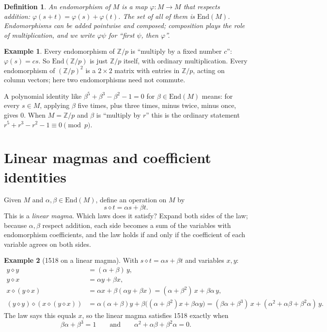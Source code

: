 \documentclass[11pt]{article}
\newtheorem{definition}{Definition}
\theoremstyle{definition}\newtheorem{example}{Example}\newtheorem{exercise}{Exercise}
\theoremstyle{remark}\newtheorem*{remark}{Remark}
\newcommand{\op}{\diamond}
\newcommand{\Z}{\mathbb{Z}}
\newcommand{\End}{\mathrm{End}}
\begin{document}
\begin{definition}
An \emph{endomorphism} of $M$ is a map $\varphi\colon M\to M$ that respects addition: $\varphi(s+t)=\varphi(s)+\varphi(t)$. The set of all of them is $\End(M)$. Endomorphisms can be added pointwise and composed; composition plays the role of multiplication, and we write $\varphi\psi$ for ``first $\psi$, then $\varphi$''.
\end{definition}

\begin{example}
Every endomorphism of $\Z/p$ is ``multiply by a fixed number $c$'': $\varphi(s)=cs$. So $\End(\Z/p)$ is just $\Z/p$ itself, with ordinary multiplication. Every endomorphism of $(\Z/p)^2$ is a $2\times 2$ matrix with entries in $\Z/p$, acting on column vectors; here two endomorphisms need not commute.
\end{example}

A polynomial identity like $\beta^5+\beta^3-\beta^2-1=0$ for $\beta\in\End(M)$ means: for every $s\in M$, applying $\beta$ five times, plus three times, minus twice, minus once, gives $0$. When $M=\Z/p$ and $\beta$ is ``multiply by $r$'' this is the ordinary statement $r^5+r^3-r^2-1\equiv 0 \pmod p$.

\section{Linear magmas and coefficient identities}\label{sec:linear}

Given $M$ and $\alpha,\beta\in\End(M)$, define an operation on $M$ by
\[
s \op t = \alpha s + \beta t .
\]
This is a \emph{linear magma}. Which laws does it satisfy? Expand both sides of the law; because $\alpha,\beta$ respect addition, each side becomes a sum of the variables with endomorphism coefficients, and the law holds if and only if the coefficient of each variable agrees on both sides.

\begin{example}[1518 on a linear magma]\label{ex:lin1518}
With $s\op t=\alpha s+\beta t$ and variables $x,y$:
\begin{align*}
y\op y &= (\alpha+\beta)\,y,\\
y\op x &= \alpha y+\beta x,\\
x\op(y\op x) &= \alpha x + \beta(\alpha y + \beta x) = (\alpha+\beta^2)\,x + \beta\alpha\, y,\\
(y\op y)\op(x\op(y\op x)) &= \alpha(\alpha+\beta)y + \beta\bigl((\alpha+\beta^2)x+\beta\alpha y\bigr)
 = (\beta\alpha+\beta^3)\,x + (\alpha^2+\alpha\beta+\beta^2\alpha)\,y .
\end{align*}
The law says this equals $x$, so the linear magma satisfies 1518 exactly when
\[
\beta\alpha+\beta^3 = 1 \qquad\text{and}\qquad \alpha^2+\alpha\beta+\beta^2\alpha = 0 .
\]
\end{example}
\end{document}
